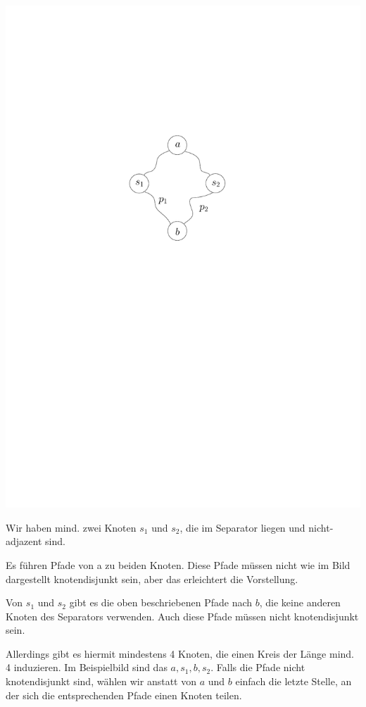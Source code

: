 \begin{center}
    \vspace{1ex}
    \includegraphics[page=1]{fig/03-2a-pfade}
\end{center}

Wir haben mind. zwei Knoten $s_1$ und $s_2$, die im Separator liegen und nicht-adjazent sind.

Es führen Pfade von a zu beiden Knoten. Diese Pfade müssen nicht wie im Bild dargestellt knotendisjunkt sein, aber das erleichtert die Vorstellung.

Von $s_1$ und $s_2$ gibt es die oben beschriebenen Pfade nach $b$, die keine anderen Knoten des Separators verwenden. Auch diese Pfade müssen nicht knotendisjunkt sein.

Allerdings gibt es hiermit mindestens 4 Knoten, die einen Kreis der Länge mind. 4 induzieren. Im Beispielbild sind das $a, s_1, b, s_2$. Falls die Pfade nicht knotendisjunkt sind, wählen wir anstatt von $a$ und $b$ einfach die letzte Stelle, an der sich die entsprechenden Pfade einen Knoten teilen.

